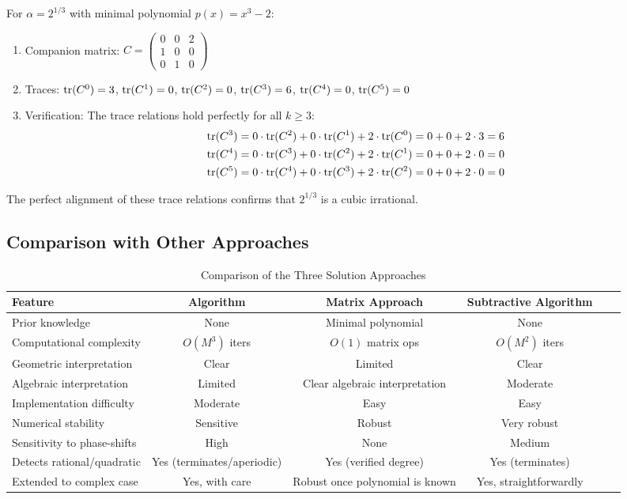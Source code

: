 \begin{example}
For $\alpha = 2^{1/3}$ with minimal polynomial $p(x) = x^3 - 2$:
\begin{enumerate}
    \item Companion matrix: $C = \begin{pmatrix} 0 & 0 & 2 \\ 1 & 0 & 0 \\ 0 & 1 & 0 \end{pmatrix}$
    \item Traces: $\operatorname{tr}(C^0) = 3$, $\operatorname{tr}(C^1) = 0$, $\operatorname{tr}(C^2) = 0$, $\operatorname{tr}(C^3) = 6$, $\operatorname{tr}(C^4) = 0$, $\operatorname{tr}(C^5) = 0$
    \item Verification: The trace relations hold perfectly for all $k \geq 3$:
    \begin{align*}
        \operatorname{tr}(C^3) &= 0 \cdot \operatorname{tr}(C^2) + 0 \cdot \operatorname{tr}(C^1) + 2 \cdot \operatorname{tr}(C^0) = 0 + 0 + 2 \cdot 3 = 6 \\
        \operatorname{tr}(C^4) &= 0 \cdot \operatorname{tr}(C^3) + 0 \cdot \operatorname{tr}(C^2) + 2 \cdot \operatorname{tr}(C^1) = 0 + 0 + 2 \cdot 0 = 0 \\
        \operatorname{tr}(C^5) &= 0 \cdot \operatorname{tr}(C^4) + 0 \cdot \operatorname{tr}(C^3) + 2 \cdot \operatorname{tr}(C^2) = 0 + 0 + 2 \cdot 0 = 0
    \end{align*}
\end{enumerate}
The perfect alignment of these trace relations confirms that $2^{1/3}$ is a cubic irrational.
\end{example}

\subsection{Comparison with Other Approaches}

\begin{table}[htbp]
\centering
\begin{tabular}{|l|c|c|c|c|c|}
\hline
\textbf{Feature} & \textbf{\HAPD{} Algorithm} & \textbf{Matrix Approach} & \textbf{Subtractive Algorithm} \\
\hline
Prior knowledge & None & Minimal polynomial & None \\
\hline
Computational complexity & $O(M^3)$ iters & $O(1)$ matrix ops & $O(M^2)$ iters \\
\hline
Geometric interpretation & Clear & Limited & Clear \\
\hline
Algebraic interpretation & Limited & Clear algebraic interpretation & Moderate \\
\hline
Implementation difficulty & Moderate & Easy & Easy \\
\hline
Numerical stability & Sensitive & Robust & Very robust \\
\hline
Sensitivity to phase-shifts & High & None & Medium \\
\hline
Detects rational/quadratic & Yes (terminates/aperiodic) & Yes (verified degree) & Yes (terminates) \\
\hline
Extended to complex case & Yes, with care & Robust once polynomial is known & Yes, straightforwardly \\
\hline
\end{tabular}
\caption{Comparison of the Three Solution Approaches}
\label{tab:verification_comparison}
\end{table}

